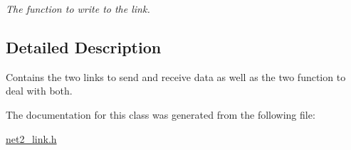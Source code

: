 \begin{DoxyCompactItemize}
\begin{DoxyCompactList}\small\item\em The function to write to the link. \end{DoxyCompactList}\end{DoxyCompactItemize}


\subsection{Detailed Description}
Contains the two links to send and receive data as well as the two function to deal with both. 

The documentation for this class was generated from the following file\-:\begin{DoxyCompactItemize}
\item 
\hyperlink{net2__link_8h}{net2\-\_\-link.\-h}\end{DoxyCompactItemize}
